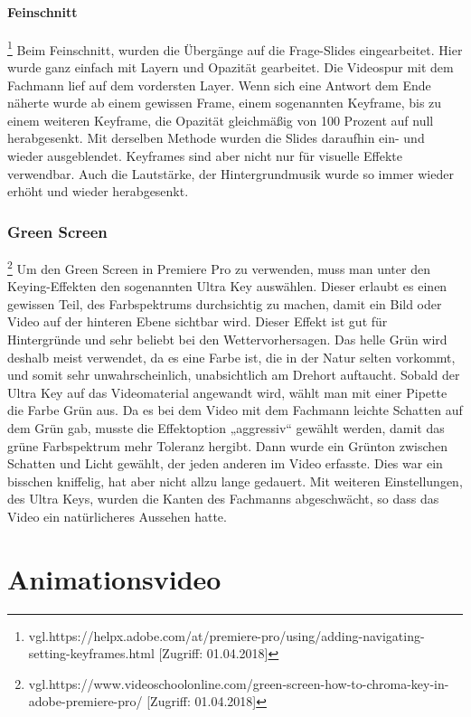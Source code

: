 \subsubsection{Feinschnitt}
\footnote{\label{} vgl.https://helpx.adobe.com/at/premiere-pro/using/adding-navigating-setting-keyframes.html [Zugriff: 01.04.2018]} 
Beim Feinschnitt, wurden die Übergänge auf die Frage-Slides eingearbeitet. Hier wurde ganz einfach mit Layern und Opazität gearbeitet. Die Videospur mit dem Fachmann lief auf dem vordersten Layer. Wenn sich eine Antwort dem Ende näherte wurde ab einem gewissen Frame, einem sogenannten Keyframe, bis zu einem weiteren Keyframe, die Opazität gleichmäßig von 100 Prozent auf null herabgesenkt. Mit derselben Methode wurden die Slides daraufhin ein- und wieder ausgeblendet. Keyframes sind aber nicht nur für visuelle Effekte verwendbar. Auch die Lautstärke, der Hintergrundmusik wurde so immer wieder erhöht und wieder herabgesenkt.
\subsection{Green Screen}
\footnote{\label{} vgl.https://www.videoschoolonline.com/green-screen-how-to-chroma-key-in-adobe-premiere-pro/ [Zugriff: 01.04.2018]} 
Um den Green Screen in Premiere Pro zu verwenden, muss man unter den Keying-Effekten den sogenannten Ultra Key auswählen. Dieser erlaubt es einen gewissen Teil, des Farbspektrums durchsichtig zu machen, damit ein Bild oder Video auf der hinteren Ebene sichtbar wird. Dieser Effekt ist gut für Hintergründe und sehr beliebt bei den Wettervorhersagen. Das helle Grün wird deshalb meist verwendet, da es eine Farbe ist, die in der Natur selten vorkommt, und somit sehr unwahrscheinlich, unabsichtlich am Drehort auftaucht. Sobald der Ultra Key auf das Videomaterial angewandt wird, wählt man mit einer Pipette die Farbe Grün aus. Da es bei dem Video mit dem Fachmann leichte Schatten auf dem Grün gab, musste die Effektoption „aggressiv“ gewählt werden, damit das grüne Farbspektrum mehr Toleranz hergibt. Dann wurde ein Grünton zwischen Schatten und Licht gewählt, der jeden anderen im Video erfasste. Dies war ein bisschen kniffelig, hat aber nicht allzu lange gedauert. Mit weiteren Einstellungen, des Ultra Keys, wurden die Kanten des Fachmanns abgeschwächt, so dass das Video ein natürlicheres Aussehen hatte.
\chapter{Animationsvideo}
